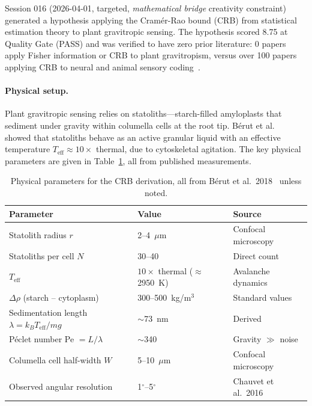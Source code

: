 Session 016 (2026-04-01, targeted, \emph{mathematical bridge} creativity constraint) generated a hypothesis applying the Cram\'{e}r-Rao bound (CRB) from statistical estimation theory to plant gravitropic sensing. The hypothesis scored 8.75 at Quality Gate (PASS) and was verified to have zero prior literature: 0 papers apply Fisher information or CRB to plant gravitropism, versus over 100 papers applying CRB to neural and animal sensory coding~\citep{chauvet2016}.

\paragraph{Physical setup.} Plant gravitropic sensing relies on statoliths---starch-filled amyloplasts that sediment under gravity within columella cells at the root tip. B\'{e}rut et al.~\citep{berut2018} showed that statoliths behave as an active granular liquid with an effective temperature $T_\text{eff} \approx 10 \times$ thermal, due to cytoskeletal agitation. The key physical parameters are given in Table~\ref{tab:crb_params}, all from published measurements.

\begin{table}[htbp]
\centering
\caption{Physical parameters for the CRB derivation, all from B\'{e}rut et al.\ 2018~\citep{berut2018} unless noted.}
\label{tab:crb_params}
\small
\begin{tabular}{@{}lll@{}}
\toprule
\textbf{Parameter} & \textbf{Value} & \textbf{Source} \\
\midrule
Statolith radius $r$ & 2--4~$\mu$m & Confocal microscopy \\
Statoliths per cell $N$ & 30--40 & Direct count \\
$T_\text{eff}$ & $10 \times$ thermal ($\approx$2950~K) & Avalanche dynamics \\
$\Delta\rho$ (starch -- cytoplasm) & 300--500~kg/m$^3$ & Standard values \\
Sedimentation length $\lambda = k_B T_\text{eff} / mg$ & $\sim$73~nm & Derived \\
P\'{e}clet number Pe $= L/\lambda$ & $\sim$340 & Gravity $\gg$ noise \\
Columella cell half-width $W$ & 5--10~$\mu$m & Confocal microscopy \\
Observed angular resolution & 1$^\circ$--5$^\circ$ & Chauvet et al.\ 2016 \\
\bottomrule
\end{tabular}
\end{table}

